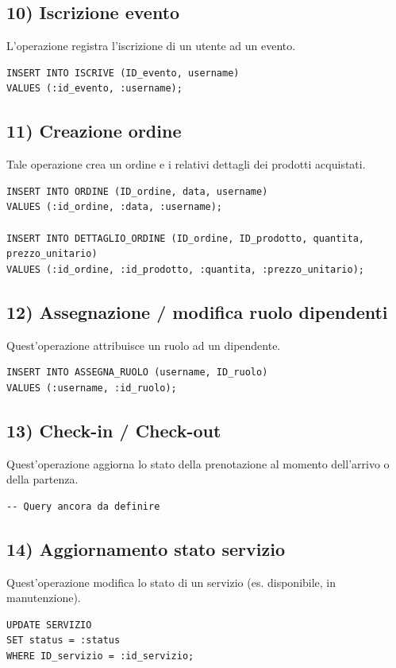 \documentclass[a4paper,12pt]{report}
\begin{document}
\subsection*{10) Iscrizione evento}
L'operazione registra l’iscrizione di un utente ad un evento.
\begin{verbatim}
INSERT INTO ISCRIVE (ID_evento, username)
VALUES (:id_evento, :username);
\end{verbatim}

\subsection*{11) Creazione ordine}
Tale operazione crea un ordine e i relativi dettagli dei prodotti acquistati.
\begin{verbatim}
INSERT INTO ORDINE (ID_ordine, data, username)
VALUES (:id_ordine, :data, :username);

INSERT INTO DETTAGLIO_ORDINE (ID_ordine, ID_prodotto, quantita, 
prezzo_unitario)
VALUES (:id_ordine, :id_prodotto, :quantita, :prezzo_unitario);
\end{verbatim}

\subsection*{12) Assegnazione / modifica ruolo dipendenti}
Quest'operazione attribuisce un ruolo ad un dipendente.
\begin{verbatim}
INSERT INTO ASSEGNA_RUOLO (username, ID_ruolo)
VALUES (:username, :id_ruolo);
\end{verbatim}

\subsection*{13) Check-in / Check-out}
Quest'operazione aggiorna lo stato della prenotazione al momento dell’arrivo o della partenza.
\begin{verbatim}
-- Query ancora da definire
\end{verbatim}

\subsection*{14) Aggiornamento stato servizio}
Quest'operazione modifica lo stato di un servizio (es. disponibile, in manutenzione).
\begin{verbatim}
UPDATE SERVIZIO
SET status = :status
WHERE ID_servizio = :id_servizio;
\end{verbatim}
\end{document}
